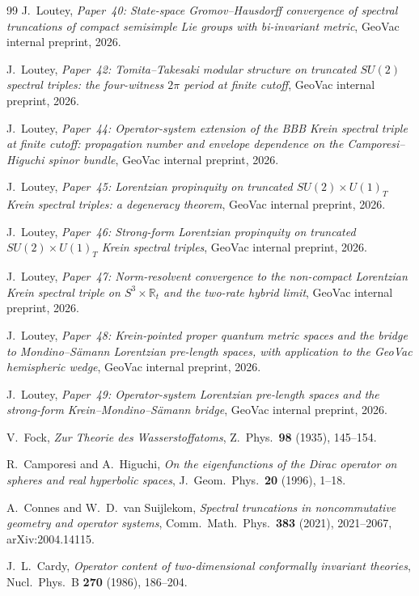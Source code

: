 \documentclass[11pt,a4paper]{article}
\theoremstyle{plain}
\theoremstyle{definition}
\begin{document}
\begin{thebibliography}{99}
 J.~Loutey,
\emph{Paper~40: State-space Gromov--Hausdorff convergence of spectral truncations of compact semisimple Lie groups with bi-invariant metric},
GeoVac internal preprint, 2026.

 J.~Loutey,
\emph{Paper~42: Tomita--Takesaki modular structure on truncated $SU(2)$ spectral triples: the four-witness $2\pi$ period at finite cutoff},
GeoVac internal preprint, 2026.

 J.~Loutey,
\emph{Paper~44: Operator-system extension of the BBB Krein spectral triple at finite cutoff: propagation number and envelope dependence on the Camporesi--Higuchi spinor bundle},
GeoVac internal preprint, 2026.

 J.~Loutey,
\emph{Paper~45: Lorentzian propinquity on truncated $SU(2) \times U(1)_{T}$ Krein spectral triples: a degeneracy theorem},
GeoVac internal preprint, 2026.

 J.~Loutey,
\emph{Paper~46: Strong-form Lorentzian propinquity on truncated $SU(2) \times U(1)_{T}$ Krein spectral triples},
GeoVac internal preprint, 2026.

 J.~Loutey,
\emph{Paper~47: Norm-resolvent convergence to the non-compact Lorentzian Krein
spectral triple on $S^3\times\mathbb{R}_t$ and the two-rate hybrid limit},
GeoVac internal preprint, 2026.

 J.~Loutey,
\emph{Paper~48: Krein-pointed proper quantum metric spaces and the bridge to
Mondino--S\"amann Lorentzian pre-length spaces, with application to the
GeoVac hemispheric wedge},
GeoVac internal preprint, 2026.

 J.~Loutey,
\emph{Paper~49: Operator-system Lorentzian pre-length spaces and the
strong-form Krein--Mondino--S\"amann bridge},
GeoVac internal preprint, 2026.

 V.~Fock,
\emph{Zur Theorie des Wasserstoffatoms},
Z.~Phys.\ \textbf{98} (1935), 145--154.

 R.~Camporesi and A.~Higuchi,
\emph{On the eigenfunctions of the Dirac operator on spheres and real hyperbolic spaces},
J.~Geom.~Phys.\ \textbf{20} (1996), 1--18.

 A.~Connes and W.~D.~van Suijlekom,
\emph{Spectral truncations in noncommutative geometry and operator systems},
Comm.~Math.~Phys.\ \textbf{383} (2021), 2021--2067, arXiv:2004.14115.

 J.~L.~Cardy,
\emph{Operator content of two-dimensional conformally invariant theories},
Nucl.~Phys.~B \textbf{270} (1986), 186--204.


\end{thebibliography}
\end{document}
